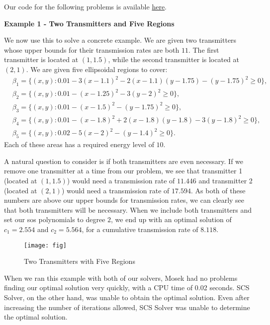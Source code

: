 	Our code for the following problems is available  \href{https://github.com/Dracoback/Polynomial-Optimization-using-Semidefinite-Programming/tree/master/Application%20-%20Wireless%20Transmission%20Problems}{here}.
	
	
	\textbf{Example 1 - Two Transmitters and Five Regions}
	
	We now use this to solve a concrete example. We are given two transmitters whose upper bounds for their transmission rates are both $11$. The first transmitter is located at $(1, 1.5)$, while the second transmitter is located at $(2, 1)$. We are given five ellipsoidal regions to cover:
	$$
	\begin{aligned}
	&\beta_1 = \{(x,y) : 0.01-3(x-1.1)^2-2(x-1.1)(y-1.75)-(y-1.75)^2 \geq 0\},\\
	&\beta_2 = \{(x,y) : 0.01-(x-1.25)^2-3(y-2)^2 \geq 0\},\\
	&\beta_3 = \{(x,y) : 0.01-(x-1.5)^2-(y-1.75)^2 \geq 0\},\\
	&\beta_4 = \{(x,y) : 0.01-(x-1.8)^2+2(x-1.8)(y-1.8)-3(y-1.8)^2 \geq 0\},\\
	&\beta_5 = \{(x,y) : 0.02-5(x-2)^2-(y-1.4)^2 \geq 0\}.
	\end{aligned}
	$$
	Each of these areas has a required energy level of $10$. 
	
	A natural question to consider is if both transmitters are even necessary. If we remove one transmitter at a time from our problem, we see that transmitter 1 (located at $(1, 1.5)$) would need a transmission rate of $11.446$ and transmitter 2 (located at $(2,1)$) would need a transmission rate of $17.594$. As both of these numbers are above our upper bounds for transmission rates, we can clearly see that both transmitters will be necessary. When we include both transmitters and set our sos polynomials to degree $2$, we end up with an optimal solution of $c_1 = 2.554$ and $c_2  = 5.564$, for a cumulative transmission rate of $8.118$. 
	\begin{figure}[h]
		\centering
		\texttt{[image: fig]}
		\caption{Two Transmitters with Five Regions}
	\end{figure}
	
	When we ran this example with both of our solvers, Mosek had no problems finding our optimal solution very quickly, with a CPU time of 0.02 seconds. SCS Solver, on the other hand, was unable to obtain the optimal solution. Even after increasing the number of iterations allowed, SCS Solver was unable to determine the optimal solution.  
	\pagebreak
	
